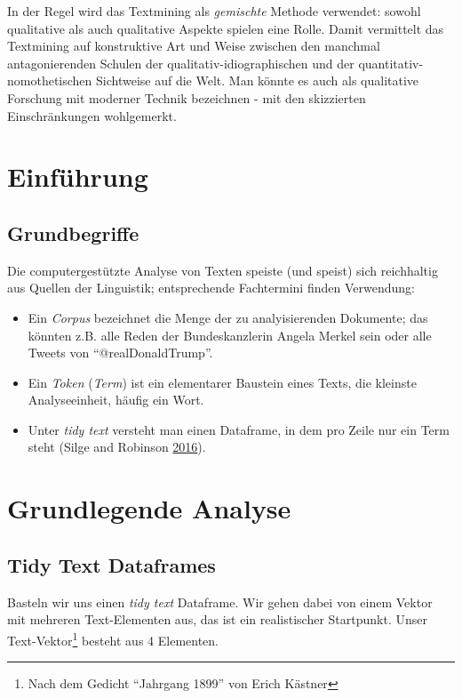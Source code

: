 \documentclass[12pt,]{book}
\begin{document}
In der Regel wird das Textmining als \emph{gemischte} Methode verwendet:
sowohl qualitative als auch qualitative Aspekte spielen eine Rolle.
Damit vermittelt das Textmining auf konstruktive Art und Weise zwischen
den manchmal antagonierenden Schulen der qualitativ-idiographischen und
der quantitativ-nomothetischen Sichtweise auf die Welt. Man könnte es
auch als qualitative Forschung mit moderner Technik bezeichnen - mit den
skizzierten Einschränkungen wohlgemerkt.

\section{Einführung}\label{einfuhrung-2}

\subsection{Grundbegriffe}\label{grundbegriffe}

Die computergestützte Analyse von Texten speiste (und speist) sich
reichhaltig aus Quellen der Linguistik; entsprechende Fachtermini finden
Verwendung:

\begin{itemize}
\item
  Ein \emph{Corpus} bezeichnet die Menge der zu analyisierenden
  Dokumente; das könnten z.B. alle Reden der Bundeskanzlerin Angela
  Merkel sein oder alle Tweets von ``@realDonaldTrump''.
\item
  Ein \emph{Token} (\emph{Term}) ist ein elementarer Baustein eines
  Texts, die kleinste Analyseeinheit, häufig ein Wort.
\item
  Unter \emph{tidy text} versteht man einen Dataframe, in dem pro Zeile
  nur ein Term steht (Silge and Robinson
  \protect\hyperlink{ref-Silge2016}{2016}).
\end{itemize}

\section{Grundlegende Analyse}\label{grundlegende-analyse}

\subsection{Tidy Text Dataframes}\label{tidy-text-dataframes}

Basteln wir uns einen \emph{tidy text} Dataframe. Wir gehen dabei von
einem Vektor mit mehreren Text-Elementen aus, das ist ein realistischer
Startpunkt. Unser Text-Vektor\footnote{Nach dem Gedicht ``Jahrgang
  1899'' von Erich Kästner} besteht aus 4 Elementen.
\end{document}
